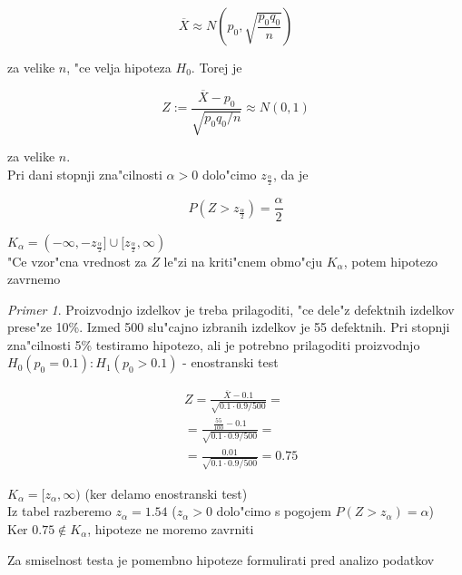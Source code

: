 \documentclass[a4paper,12pt]{article}
\theoremstyle{definition}
\theoremstyle{remark}
\newtheorem*{ex}{Primer}
\begin{document}
\begin{equation*}
    \overline{X} \approx N(p_0, \sqrt{\frac{p_0 q_0}{n}})
\end{equation*}

za velike $n$, "ce velja hipoteza $H_0$. Torej je

\begin{equation*}
    Z := \frac{\overline{X} - p_0}{\sqrt{p_0 q_0 / n}} \approx N(0,1)
\end{equation*}

za velike $n$. \\
Pri dani stopnji zna"cilnosti $\alpha > 0$ dolo"cimo $z_{\frac{\alpha}{2}}$, da je

\begin{equation*}
    P(Z > z_{\frac{\alpha}{2}}) = \frac{\alpha}{2}
\end{equation*}


$K_{\alpha} = (-\infty, -z_{\frac{\alpha}{2}}] \cup [z_{\frac{\alpha}{2}}, \infty)$ \\
"Ce vzor"cna vrednost za $Z$ le"zi na kriti"cnem obmo"cju $K_{\alpha}$, potem hipotezo zavrnemo

\begin{ex}
    Proizvodnjo izdelkov je treba prilagoditi, "ce dele"z defektnih izdelkov prese"ze 10\%. Izmed 500 slu"cajno izbranih izdelkov
    je 55 defektnih. Pri stopnji zna"cilnosti 5\% testiramo hipotezo, ali je potrebno prilagoditi proizvodnjo \\
    $H_0(p_0 = 0.1) : H_1(p_0 > 0.1)$ - enostranski test

    \begin{align*}
        &Z = \frac{\overline{X} - 0.1}{\sqrt{0.1 \cdot 0.9 / 500}} = \\
        &= \frac{\frac{55}{100} - 0.1}{\sqrt{0.1 \cdot 0.9 / 500}} = \\
        &= \frac{0.01}{\sqrt{0.1 \cdot 0.9 / 500}} = 0.75
    \end{align*}


    $K_{\alpha} = [z_{\alpha}, \infty)$ (ker delamo enostranski test) \\
    Iz tabel razberemo $z_{\alpha} = 1.54$ ($z_{\alpha} > 0$ dolo"cimo s pogojem $P(Z > z_{\alpha}) = \alpha$) \\
    Ker $0.75 \notin K_{\alpha}$, hipoteze ne moremo zavrniti
\end{ex}

Za smiselnost testa je pomembno hipoteze formulirati pred analizo podatkov
\end{document}
